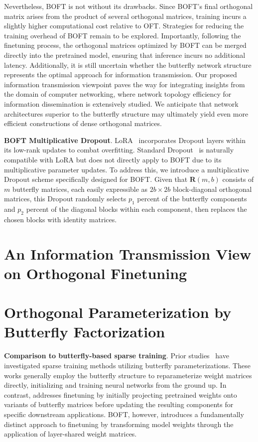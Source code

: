 Nevertheless, BOFT is not without its drawbacks. Since BOFT’s final orthogonal matrix arises from the product of several orthogonal matrices, training incurs a slightly higher computational cost relative to OFT. Strategies for reducing the training overhead of BOFT remain to be explored. Importantly, following the finetuning process, the orthogonal matrices optimized by BOFT can be merged directly into the pretrained model, ensuring that inference incurs no additional latency. Additionally, it is still uncertain whether the butterfly network structure represents the optimal approach for information transmission. Our proposed information transmission viewpoint paves the way for integrating insights from the domain of computer networking, where network topology efficiency for information dissemination is extensively studied. We anticipate that network architectures superior to the butterfly structure may ultimately yield even more efficient constructions of dense orthogonal matrices.

\textbf{BOFT Multiplicative Dropout}. LoRA~\cite{hulora2022} incorporates Dropout layers within its low-rank updates to combat overfitting. Standard Dropout~\cite{srivastava2014dropout} is naturally compatible with LoRA but does not directly apply to BOFT due to its multiplicative parameter updates. To address this, we introduce a multiplicative Dropout scheme specifically designed for BOFT. Given that $\bm{R}(m,b)$ consists of $m$ butterfly matrices, each easily expressible as $2b\times 2b$ block-diagonal orthogonal matrices, this Dropout randomly selects $p_1$ percent of the butterfly components and $p_2$ percent of the diagonal blocks within each component, then replaces the chosen blocks with identity matrices.

\section{An Information Transmission View on Orthogonal Finetuning}

\section{Orthogonal Parameterization by Butterfly Factorization}

\textbf{Comparison to butterfly-based sparse training}. Prior studies~\cite{dao2019learning,dao2019kaleidoscope,chen2022pixelated,dao2022monarch} have investigated sparse training methods utilizing butterfly parameterizations. These works generally employ the butterfly structure to reparameterize weight matrices directly, initializing and training neural networks from the ground up. In contrast, \cite{dao2022monarch} addresses finetuning by initially projecting pretrained weights onto variants of butterfly matrices before updating the resulting components for specific downstream applications. BOFT, however, introduces a fundamentally distinct approach to finetuning by transforming model weights through the application of layer-shared weight matrices.


